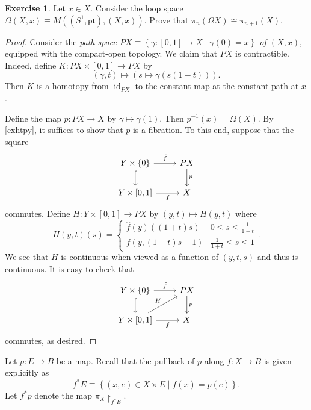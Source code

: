 \documentclass[10pt,letterpaper,cm]{nupset}
\theoremstyle{definition}
\theoremstyle{theorem}
\newtheorem{exercise}[defn]{Exercise}
\theoremstyle{remark}
\newcommand{\1}{\mathbb{1}}
\newcommand{\0}{\vec 0}
\newcommand{\pt}{\mathsf{pt}}
\DeclareMathOperator{\id}{id}
\begin{document}
\begin{exercise}\label{loop}
Let $x\in X$. Consider the  loop space $\Omega(X, x) \equiv M((S^1, \pt), (X, x))$. Prove that $\pi_n(\Omega{X})\cong \pi_{n+1}(X)$.
\end{exercise}
\begin{proof}
Consider the \textit{path space $P{X} \equiv \left\{\gamma : \left[0,1\right] \to X \mid \gamma(0) =x\right\}$ of $\left(X,x\right)$}, equipped with the compact-open topology. We claim that $P{X}$ is contractible. Indeed, define $K: P{X} \times \left[0,1\right] \to P{X}$ by $$\left(\gamma, t\right) \mapsto \left(s \mapsto \gamma(s(1-t))\right).$$ Then $K$ is a homotopy from $\id_{P{X}}$ to the constant map at the constant path at $x$.

\medskip

Define the map $p : P{X} \to X$ by $\gamma \mapsto \gamma(1)$. Then $p^{-1}(x) = \Omega(X)$. By \cref{exhtpy}, it suffices to show that $p$ is a fibration. To this end, suppose that the square
\[
\begin{tikzcd}
Y\times \left\{0\right\} \arrow[d, hook] \arrow[r, "\hat{f}"] & P{X} \arrow[d, "p"] \\
{Y\times \left[0,1\right]} \arrow[r, "f"']                    & X                  
\end{tikzcd}
\] commutes. Define $H: Y \times \left[0,1\right] \to P{X}$ by $\left(y, t\right) \mapsto  H(y,t)$ where 
\[
H(y, t)(s) = \begin{cases} 
\hat{f}(y)\left((1+t)s\right) & 0\leq s\leq \frac{1}{1+t}
\\ f(y, (1+t)s -1) & \frac{1}{1+t}\leq s \leq 1
\end{cases}.
\] We see that $H$ is continuous when viewed as a function of $\left(y,t,s\right)$ and thus is continuous. It is easy to check that 
\[
\begin{tikzcd}
Y\times \left\{0\right\} \arrow[d, hook] \arrow[r, "\hat{f}"] & P{X} \arrow[d, "p"] \\
{Y\times \left[0,1\right]} \arrow[r, "f"'] \arrow[ru, "H"]    & X                  
\end{tikzcd}
\] commutes, as desired.
\end{proof}

Let $p : E \to B$ be a map. Recall that the pullback of $p$ along $f : X \to B$ is given explicitly as   $$f^{\ast}{E} \equiv \left\{\left(x, e\right) \in X \times E \mid f(x) = p(e)\right\}.$$  Let  $f^{\ast}{p}$ denote the map $\pi_X\restriction_{f^{\ast}{E}}$.
\end{document}
